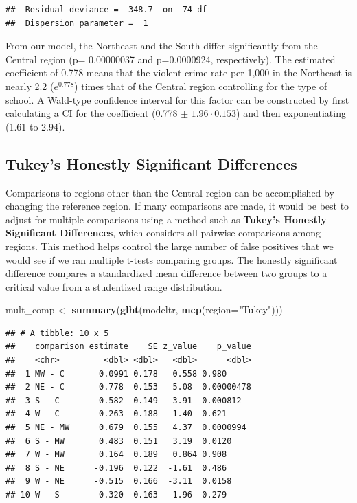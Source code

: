 \documentclass[
]{krantz}
\newenvironment{Shaded}{\begin{snugshade}}{\end{snugshade}}
\newcommand{\AttributeTok}[1]{\textcolor[rgb]{0.27,0.27,0.27}{#1}}
\newcommand{\FunctionTok}[1]{\textcolor[rgb]{0.27,0.27,0.27}{\textbf{#1}}}
\newcommand{\NormalTok}[1]{#1}
\newcommand{\OtherTok}[1]{\textcolor[rgb]{0.37,0.37,0.37}{#1}}
\newcommand{\StringTok}[1]{\textcolor[rgb]{0.5,0.5,0.5}{#1}}
\begin{document}
\begin{verbatim}
##  Residual deviance =  348.7  on  74 df 
##  Dispersion parameter =  1
\end{verbatim}

From our model, the Northeast and the South differ significantly from the Central region (p= 0.00000037 and p=0.0000924, respectively). The estimated coefficient of 0.778 means that the violent crime rate per 1,000 in the Northeast is nearly 2.2 (\(e^{0.778}\)) times that of the Central region controlling for the type of school. A Wald-type confidence interval for this factor can be constructed by first calculating a CI for the coefficient (0.778 \(\pm\) \(1.96 \cdot 0.153\)) and then exponentiating (1.61 to 2.94).

\subsection{Tukey's Honestly Significant Differences}\label{tukeys-honestly-significant-differences}

Comparisons to regions other than the Central region can be accomplished by changing the reference region. If many comparisons are made, it would be best to adjust for multiple comparisons using a method such as \textbf{Tukey's Honestly Significant Differences},  which considers all pairwise comparisons among regions. This method helps control the large number of false positives that we would see if we ran multiple t-tests comparing groups. The honestly significant difference compares a standardized mean difference between two groups to a critical value from a studentized range distribution.

\begin{Shaded}
\begin{Highlighting}[]
\NormalTok{mult\_comp }\OtherTok{\textless{}{-}} \FunctionTok{summary}\NormalTok{(}\FunctionTok{glht}\NormalTok{(modeltr, }\FunctionTok{mcp}\NormalTok{(}\AttributeTok{region=}\StringTok{"Tukey"}\NormalTok{)))}
\end{Highlighting}
\end{Shaded}

\begin{verbatim}
## # A tibble: 10 x 5
##    comparison estimate    SE z_value    p_value
##    <chr>         <dbl> <dbl>   <dbl>      <dbl>
##  1 MW - C       0.0991 0.178   0.558 0.980     
##  2 NE - C       0.778  0.153   5.08  0.00000478
##  3 S - C        0.582  0.149   3.91  0.000812  
##  4 W - C        0.263  0.188   1.40  0.621     
##  5 NE - MW      0.679  0.155   4.37  0.0000994 
##  6 S - MW       0.483  0.151   3.19  0.0120    
##  7 W - MW       0.164  0.189   0.864 0.908     
##  8 S - NE      -0.196  0.122  -1.61  0.486     
##  9 W - NE      -0.515  0.166  -3.11  0.0158    
## 10 W - S       -0.320  0.163  -1.96  0.279
\end{verbatim}
\end{document}
